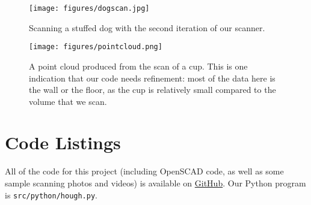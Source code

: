 \documentclass[12pt, letterpaper]{article}
\begin{document}
\begin{figure}[ht]
    \centering
    \texttt{[image: figures/dogscan.jpg]}
    \caption{Scanning a stuffed dog with the second iteration of our scanner.}
\end{figure}

\begin{figure}[ht]
    \centering
    \texttt{[image: figures/pointcloud.png]}
    \caption{A point cloud produced from the scan of a cup. This is one indication that our
    code needs refinement: most of the data here is the wall or the floor, as the cup is
relatively small compared to the volume that we scan.}
\end{figure}

\section{Code Listings}
All of the code for this project (including OpenSCAD code, as well as some sample
scanning photos and videos) is available on
\href{https://github.com/nhalford/3d-scanner/}{GitHub}. Our Python program is
\texttt{src/python/hough.py}.
\end{document}
